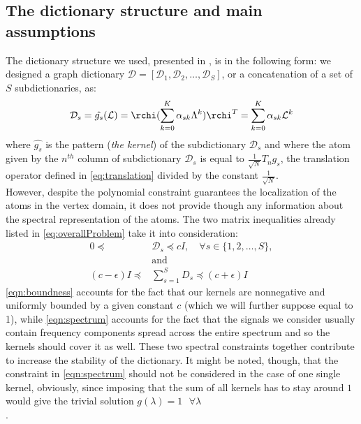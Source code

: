 \subsection{The dictionary structure and main assumptions}
The dictionary structure we used, presented in \cite{Thanou2014}, is in the following form: we designed a graph dictionary $\mathcal{D} = [\mathcal{D}_1, \mathcal{D}_2,\dots,\mathcal{D}_S]$, or a concatenation of a set of $S$ subdictionaries, as:
\begin{equation}
  \mathcal{D}_s = \hat{g_s}(\mathcal{L}) = \rchi (\sum_{k=0}^K \alpha_{sk}\Lambda^k)\rchi^T =   \sum_{k=0}^{K} \alpha_{sk}\mathcal{L}^k
\end{equation}
where $\hat{g_s}$ is the pattern (\textit{the kernel}) of the subdictionary $\mathcal{D}_s$ and where the atom given by the $n^{th}$ column of subdictionary $\mathcal{D}_s$ is equal to $\frac{1}{\sqrt{N}}T_ng_s$, the translation operator defined in \autoref{eq:translation} divided by the constant $\frac{1}{\sqrt{N}}$.\\
However, despite the polynomial constraint guarantees the localization of the atoms in the vertex domain, it does not provide though any information about the spectral representation of the atoms. The two matrix inequalities already listed in \ref{eq:overallProblem} take it into consideration:
\begin{align}
  0 \preceq \text{ } &\mathcal{D}_s \preceq cI, \quad \forall s \in \{1,2,\dots , S\},  \label{eqn:boundness}\\
  &\text{and}\\
  (c-\epsilon)I \preceq &\sum_{s=1}^{S}D_s \preceq (c+\epsilon)I \label{eqn:spectrum}
\end{align}
\autoref{eqn:boundness} accounts for the fact that our kernels are nonnegative and uniformly bounded by a given constant $c$ (which we will further suppose equal to 1), while \autoref{eqn:spectrum} accounts for the fact that the signals we consider usually contain frequency components spread across the entire spectrum and so the kernels should cover it as well. These two spectral constraints together contribute to increase the stability of the dictionary. It might be noted, though, that the constraint in \autoref{eqn:spectrum}  should not be considered in the case of one single kernel, obviously, since imposing that the sum of all kernels has to stay around $1$ would give the trivial solution $g(\lambda) = 1 \text{  } \forall \lambda$\\.

